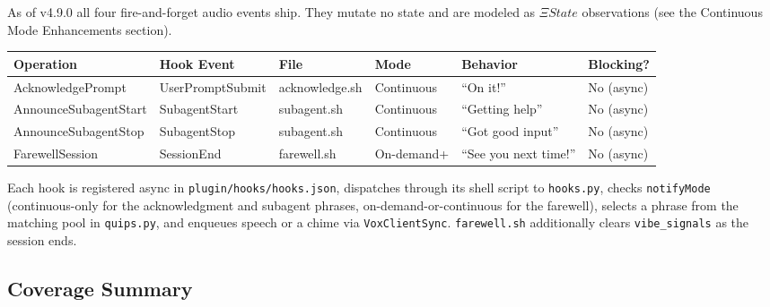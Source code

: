 \documentclass[a4paper,10pt,fleqn]{article}
\begin{document}
As of v4.9.0 all four fire-and-forget audio events ship. They mutate
no state and are modeled as $\Xi State$ observations (see the
Continuous Mode Enhancements section).

\begin{tabular}{llllll}
\hline
\textbf{Operation} & \textbf{Hook Event} & \textbf{File} & \textbf{Mode} & \textbf{Behavior} & \textbf{Blocking?} \\
\hline
AcknowledgePrompt & UserPromptSubmit & acknowledge.sh & Continuous & ``On it!'' & No (async) \\
AnnounceSubagentStart & SubagentStart & subagent.sh & Continuous & ``Getting help'' & No (async) \\
AnnounceSubagentStop & SubagentStop & subagent.sh & Continuous & ``Got good input'' & No (async) \\
FarewellSession & SessionEnd & farewell.sh & On-demand+ & ``See you next time!'' & No (async) \\
\hline
\end{tabular}

Each hook is registered async in \texttt{plugin/hooks/hooks.json}, dispatches
through its shell script to \texttt{hooks.py}, checks \texttt{notifyMode}
(continuous-only for the acknowledgment and subagent phrases,
on-demand-or-continuous for the farewell), selects a phrase from the
matching pool in \texttt{quips.py}, and enqueues speech or a chime via
\texttt{VoxClientSync}. \texttt{farewell.sh} additionally clears
\texttt{vibe\_signals} as the session ends.

\subsection{Coverage Summary}
\end{document}
